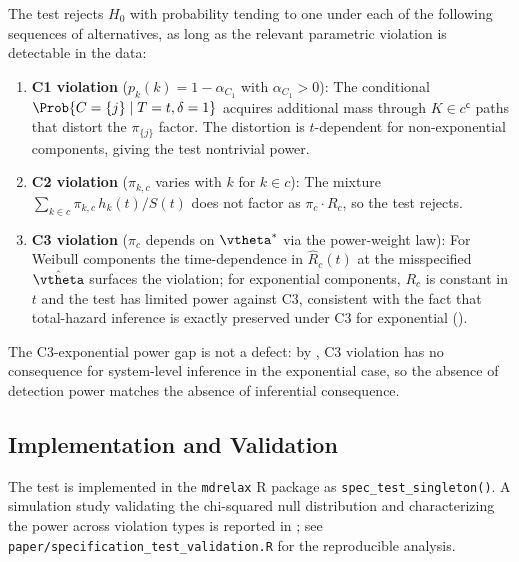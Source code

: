 \begin{proposition}
\label{prop:power}
The test rejects $H_0$ with probability tending to one under each of the
following sequences of alternatives, as long as the relevant parametric
violation is detectable in the data:
\begin{enumerate}
    \item \textbf{C1 violation} ($p_k(k) = 1 - \alpha_{C_1}$ with
        $\alpha_{C_1} > 0$): The conditional
        $\Prob\{C = \{j\} \mid T = t, \delta = 1\}$ acquires additional
        mass through $K \in c^{\mathsf c}$ paths that distort the
        $\pi_{\{j\}}$ factor. The distortion is $t$-dependent for
        non-exponential components, giving the test nontrivial power.
    \item \textbf{C2 violation} ($\pi_{k, c}$ varies with $k$ for
        $k \in c$): The mixture
        $\sum_{k \in c} \pi_{k,c}\, h_k(t)/S(t)$ does not factor as
        $\pi_c \cdot R_c$, so the test rejects.
    \item \textbf{C3 violation} ($\pi_c$ depends on $\vtheta^*$ via the
        power-weight law): For Weibull components the time-dependence in
        $\hat R_c(t)$ at the misspecified $\hat\vtheta$ surfaces the
        violation; for exponential components, $R_c$ is constant in $t$
        and the test has limited power against C3, consistent with the
        fact that total-hazard inference is exactly preserved under C3
        for exponential ().
\end{enumerate}
\end{proposition}

The C3-exponential power gap is not a defect: by
, C3 violation has no consequence for
system-level inference in the exponential case, so the absence of
detection power matches the absence of inferential consequence.

\subsection{Implementation and Validation}

The test is implemented in the \texttt{mdrelax} R package as
\texttt{spec\_test\_singleton()}. A simulation study validating the
chi-squared null distribution and characterizing the power across
violation types is reported in ; see
\texttt{paper/specification\_test\_validation.R} for the reproducible
analysis.

